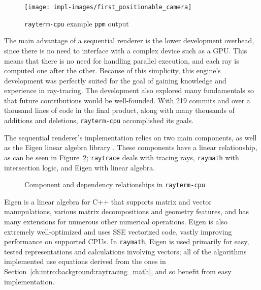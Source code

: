 \vspace{0.3em}
\begin{figure}[htb]
  \centering
  \texttt{[image: impl-images/first\_positionable\_camera]}
  \caption{\texttt{rayterm-cpu} example \texttt{ppm} output}
  \label{fig:rayterm-cpu_ppm}
\end{figure}

The main advantage of a sequential renderer is the lower development overhead, since there is no need to interface with a complex device such as a GPU.
This means that there is no need for handling parallel execution, and each ray is computed one after the other.
Because of this simplicity, this engine's development was perfectly suited for the goal of gaining knowledge and experience in ray-tracing.
The development also explored many fundamentals so that future contributions would be well-founded.
With 219 commits and over a thousand lines of code in the final product, along with many thousands of additions and deletions, \texttt{rayterm-cpu} accomplished its goals.

 \label{ch:methods:renderer:sequential:components}

The sequential renderer's implementation relies on two main components, as well as the Eigen linear algebra library \cite{eigenweb}.
These components have a linear relationship, as can be seen in Figure~\ref{fig:rayterm-cpu_components}; \texttt{raytrace} deals with tracing rays, \texttt{raymath} with intersection logic, and Eigen with linear algebra.

\vspace{0.3em}
\begin{figure}[htb]
  \centering
  \caption{Component and dependency relationships in \texttt{rayterm-cpu}}
  \label{fig:rayterm-cpu_components}
\end{figure}

Eigen \cite{eigenweb} is a linear algebra for C++ that supports matrix and vector manupulations, various matrix decompositions and geometry features, and has many extensions for numerous other numerical operations.
Eigen is also extremely well-optimized and uses SSE vectorized code, vastly improving performance on supported CPUs.
In \texttt{raymath}, Eigen is used primarily for easy, tested representations and calculations involving vectors; all of the algorithms implemented use equations derived from the ones in Section~\ref{ch:intro:background:raytracing_math}, and so benefit from easy implementation.


